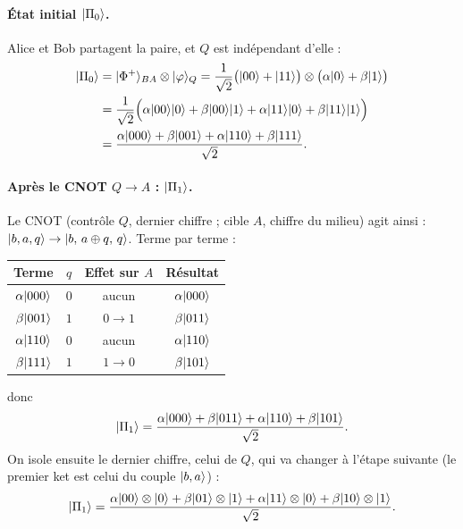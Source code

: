 \paragraph{État initial $|\Pi_0\rangle$.} Alice et Bob partagent la paire, et $Q$ est indépendant
d'elle :
\begin{align*}
  |\Pi_0\rangle&=|\Phi^+\rangle_{BA}\otimes|\varphi\rangle_Q
    =\frac{1}{\sqrt2}\big(|00\rangle+|11\rangle\big)\otimes\big(\alpha|0\rangle+\beta|1\rangle\big)\\
  &=\frac{1}{\sqrt2}\Big(\alpha|00\rangle|0\rangle+\beta|00\rangle|1\rangle+\alpha|11\rangle|0\rangle+\beta|11\rangle|1\rangle\Big)\\
  &=\frac{\alpha|000\rangle+\beta|001\rangle+\alpha|110\rangle+\beta|111\rangle}{\sqrt2}.
\end{align*}

\paragraph{Après le CNOT $Q\to A$ : $|\Pi_1\rangle$.} Le CNOT (contrôle $Q$, dernier chiffre ;
cible $A$, chiffre du milieu) agit ainsi : $|b,a,q\rangle\to|b,\,a\oplus q,\,q\rangle$. Terme par terme :
\begin{center}
\renewcommand{\arraystretch}{1.3}
\begin{tabular}{@{}cccc@{}}
\toprule
Terme & $q$ & Effet sur $A$ & Résultat \\
\midrule
$\alpha|000\rangle$ & $0$ & aucun & $\alpha|000\rangle$ \\
$\beta|001\rangle$ & $1$ & $0\to1$ & $\beta|011\rangle$ \\
$\alpha|110\rangle$ & $0$ & aucun & $\alpha|110\rangle$ \\
$\beta|111\rangle$ & $1$ & $1\to0$ & $\beta|101\rangle$ \\
\bottomrule
\end{tabular}
\end{center}
donc
\[
  |\Pi_1\rangle=\frac{\alpha|000\rangle+\beta|011\rangle+\alpha|110\rangle+\beta|101\rangle}{\sqrt2}.
\]
On isole ensuite le dernier chiffre, celui de $Q$, qui va changer à l'étape suivante
(le premier ket est celui du couple $|b,a\rangle$) :
\[
  |\Pi_1\rangle=\frac{\alpha|00\rangle\otimes|0\rangle+\beta|01\rangle\otimes|1\rangle
    +\alpha|11\rangle\otimes|0\rangle+\beta|10\rangle\otimes|1\rangle}{\sqrt2}.
\]

